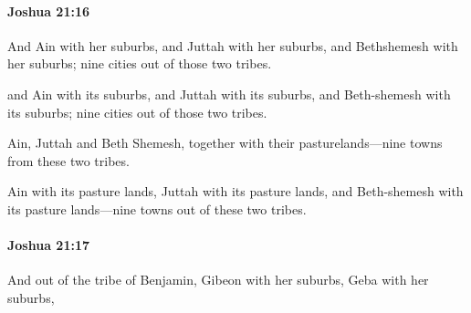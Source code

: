 		\paragraph{Joshua 21:16} %
			\label{JOSHUA-21-16}

			And Ain with her suburbs, and Juttah with her suburbs, and Bethshemesh with her suburbs; nine cities out of those two tribes.

			\begin{versebox}
					\item[BHS] 
					\item[ASV] and Ain with its suburbs, and Juttah with its suburbs, and Beth-shemesh with its suburbs; nine cities out of those two tribes.
					\item[NIV] Ain, Juttah and Beth Shemesh, together with their pasturelands—nine towns from these two tribes.
					\item[NRSV] Ain with its pasture lands, Juttah with its pasture lands, and Beth-shemesh with its pasture lands—nine towns out of these two tribes.
			\end{versebox}

		\paragraph{Joshua 21:17} %
			\label{JOSHUA-21-17}

			And out of the tribe of Benjamin, Gibeon with her suburbs, Geba with her suburbs,

